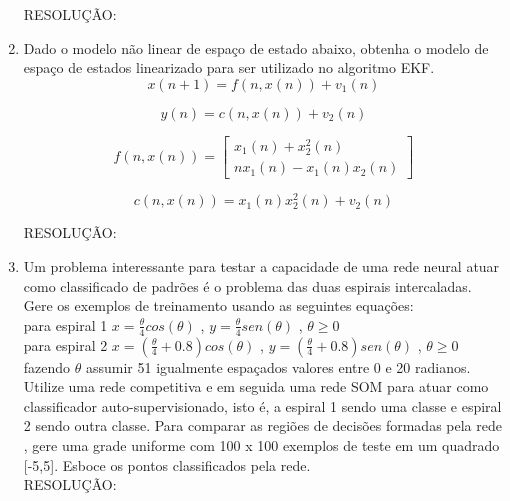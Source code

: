 \documentclass[a4paper,oneside,12pt]{article}
\begin{document}
\begin{enumerate}[1.]
RESOLU\c{C}\~AO: \\

\item Dado o modelo n\~ao linear de espa\c{c}o de estado abaixo, obtenha o modelo de espa\c{c}o de estados linearizado para ser utilizado no algoritmo EKF. \\

\begin{equation*}
x(n+1) = f(n, x(n)) + v_{1}(n)
\end{equation*}

\begin{equation*}
y(n) = c(n,x(n)) + v_{2}(n)
\end{equation*}

\begin{equation*}
f(n, x(n)) = \begin{bmatrix}
x_{1}(n) + x_{2}^{2}(n) \\
nx_{1}(n) - x_{1}(n)x_{2}(n)
\end{bmatrix}
\end{equation*}

\begin{equation*}
c(n, x(n)) = x_{1}(n)x_{2}^{2}(n) + v_{2}(n)
\end{equation*}

RESOLU\c{C}\~AO: \\

\item Um problema interessante para testar a capacidade de uma rede neural atuar como classificado de padr\~oes \'e o problema das duas espirais intercaladas. Gere os exemplos de treinamento usando as seguintes equa\c{c}\~oes: \\
para espiral 1 $x = \frac{\theta}{4} cos(\theta)$ , $y = \frac{\theta}{4} sen(\theta)$ , $\theta \geq 0$ \\
para espiral 2 $x = (\frac{\theta}{4} + 0.8) cos(\theta)$ , $y = (\frac{\theta}{4} + 0.8) sen(\theta)$ , $\theta \geq 0$ \\
fazendo $\theta$ assumir 51 igualmente espa\c{c}ados valores entre 0 e 20 radianos. Utilize uma rede competitiva e em seguida uma rede SOM para atuar como classificador auto-supervisionado, isto \'e, a espiral 1 sendo uma classe e espiral 2 sendo outra classe. Para comparar as regi\~oes de decis\~oes formadas pela rede , gere uma grade uniforme com 100 x 100 exemplos de teste em um quadrado [-5,5]. Esboce os pontos classificados pela rede. \\

RESOLU\c{C}\~AO: \\


\end{enumerate}
\end{document}

